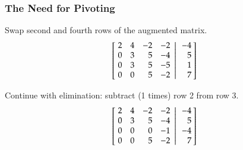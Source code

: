 \documentclass[10pt]{beamer}
\begin{document}
\begin{frame}
\frametitle{The Need for Pivoting}

Swap second and fourth rows of the augmented matrix.
\begin{equation*}
    \left[
           \left.\negthickspace\begin{array}{rrrr}  2 &  4 & -2 & -2 \\
                                                    0 &  3 &  5 & -4 \\
                                                    0 &  3 &  5 & -5 \\
                                                    0 &  0 &  5 & -2 \end{array}
           \right|\begin{array}{r} -4 \\  5 \\ 1 \\ 7 \end{array}\negthickspace\right]
\end{equation*}

Continue with elimination: subtract (1 times) row 2 from row 3.
\begin{equation*}
    \left[
           \left.\negthickspace\begin{array}{rrrr}  2 &  4 & -2 & -2 \\
                                                    0 &  3 &  5 & -4 \\
                                                    0 &  0 &  0 & -1 \\
                                                    0 &  0 &  5 & -2 \end{array}
           \right|\begin{array}{r} -4 \\  5 \\ -4 \\ 7 \end{array}\negthickspace\right]
\end{equation*}

\end{frame}
\end{document}
